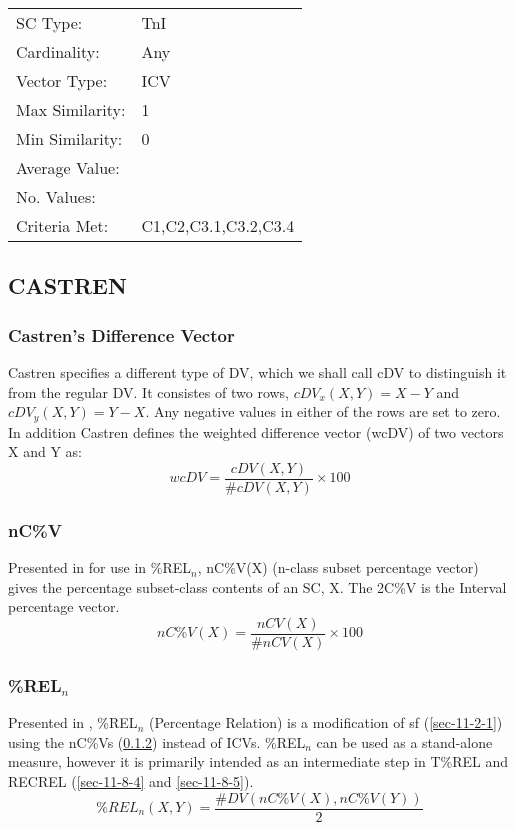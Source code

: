 \documentclass{article}
\begin{document}
\begin{center}
\begin{tabular}{ll}
 SC Type:         &  TnI                   \\
 Cardinality:     &  Any                   \\
 Vector Type:     &  ICV                   \\
 Max Similarity:  &  1                     \\
 Min Similarity:  &  0                     \\
 Average Value:   &                        \\
 No. Values:      &                        \\
 Criteria Met:    &  C1,C2,C3.1,C3.2,C3.4  \\
\end{tabular}
\end{center}
\subsection{CASTREN}
\label{sec-11-8}
\subsubsection{Castren's Difference Vector}
\label{sec-11-8-1}

Castren specifies a different type of DV, which we shall call cDV to
distinguish it from the regular DV. It consistes of two rows,
$cDV_{x}(X,Y)=X-Y$ and $cDV_{y}(X,Y)=Y-X$. Any negative values in
either of the rows are set to zero.  In addition Castren defines the
weighted difference vector (wcDV) of two vectors X and Y as:
$$wcDV=\frac{cDV(X,Y)}{\#cDV(X,Y)}\times 100$$
\subsubsection{nC\%V}
\label{sec-11-8-2}

Presented in \citet{Castren1994} for use in \%REL$_{n}$, nC\%V(X) (n-class
subset percentage vector) gives the percentage subset-class contents
of an SC, X. The 2C\%V is the Interval percentage vector.
$$nC\%V(X)=\frac{nCV(X)}{\#nCV(X)}\times 100$$
\subsubsection{\%REL$_{n}$}
\label{sec-11-8-3}

Presented in \citet{Castren1994}, \%REL$_{n}$ (Percentage Relation) is a
modification of sf (\ref{sec-11-2-1}) using the nC\%Vs (\ref{sec-11-8-2}) instead of
ICVs. \%REL$_{n}$ can be used as a stand-alone measure, however it is
primarily intended as an intermediate step in T\%REL and RECREL (\ref{sec-11-8-4}
and \ref{sec-11-8-5}). $$\%REL_n(X,Y)=\frac{\#DV(nC\%V(X),nC\%V(Y))}{2}$$
\end{document}
